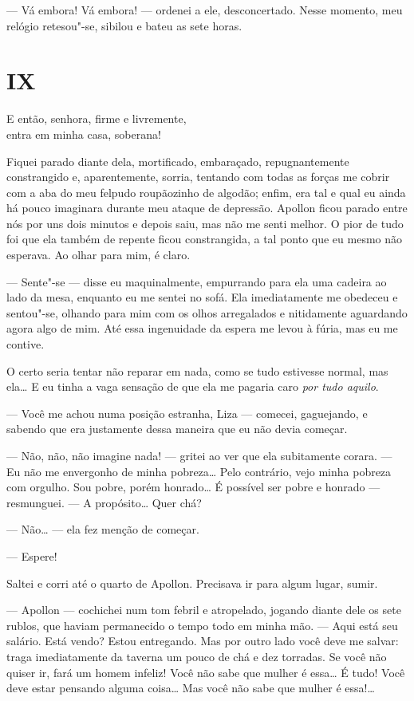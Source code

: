--- Vá embora! Vá embora! --- ordenei a ele, desconcertado. Nesse momento,
meu relógio retesou"-se, sibilou e bateu as sete horas.


\section{IX}

\epigraph{%
E então, senhora, firme e livremente,\\
entra em minha casa, soberana!}{}


\noindent{}Fiquei parado diante dela, mortificado, embaraçado, repugnantemente
constrangido e, aparentemente, sorria, tentando com todas as forças me
cobrir com a aba do meu felpudo roupãozinho de algodão; enfim, era tal
e qual eu ainda há pouco imaginara durante meu ataque de depressão.
Apollon ficou parado entre nós por uns dois minutos e depois saiu, mas
não me senti melhor. O pior de tudo foi que ela também de repente ficou
constrangida, a tal ponto que eu mesmo não esperava. Ao olhar para mim,
é claro.

--- Sente"-se --- disse eu maquinalmente, empurrando para ela uma cadeira ao
lado da mesa, enquanto eu me sentei no sofá. Ela imediatamente me
obedeceu e sentou"-se, olhando para mim com os olhos arregalados e
nitidamente aguardando agora algo de mim. Até essa ingenuidade da
espera me levou à fúria, mas eu me contive.

O certo seria tentar não reparar em nada, como se tudo estivesse normal,
mas ela\ldots{} E eu tinha a vaga sensação de que ela me pagaria caro
\textit{por tudo aquilo}.

--- Você me achou numa posição estranha, Liza --- comecei, gaguejando, e
sabendo que era justamente dessa maneira que eu não devia começar.

--- Não, não, não imagine nada! --- gritei ao ver que ela subitamente
corara. --- Eu não me envergonho de minha pobreza\ldots{} Pelo contrário, vejo
minha pobreza com orgulho. Sou pobre, porém honrado\ldots{} É possível ser
pobre e honrado --- resmunguei. --- A propósito\ldots{} Quer chá?

--- Não\ldots{} --- ela fez menção de começar.

--- Espere!

Saltei e corri até o quarto de Apollon. Precisava ir para algum lugar,
sumir.

--- Apollon --- cochichei num tom febril e atropelado, jogando diante dele
os sete rublos, que haviam permanecido o tempo todo em minha mão. ---
Aqui está seu salário. Está vendo? Estou entregando. Mas por outro lado
você deve me salvar: traga imediatamente da taverna um pouco de chá e
dez torradas. Se você não quiser ir, fará um homem infeliz! Você não
sabe que mulher é essa\ldots{} É tudo! Você deve estar pensando alguma
coisa\ldots{} Mas você não sabe que mulher é essa!\ldots{}

